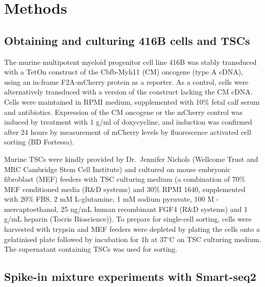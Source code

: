 \documentclass{article}
\begin{document}
\section{Methods}

\subsection{Obtaining and culturing 416B cells and TSCs}

The murine multipotent myeloid progenitor cell line 416B \cite{dexter1979isolation} was stably transduced with a TetOn construct of the Cbfb-Myh11 (CM) oncogene (type A cDNA), using an in-frame F2A-mCherry protein as a reporter. 
As a control, cells were alternatively transduced with a version of the construct lacking the CM cDNA. 
Cells were maintained in RPMI medium, supplemented with 10\% fetal calf serum and antibiotics.
Expression of the CM oncogene or the mCherry control was induced by treatment with 1 \textmu{}g/ml of doxycycline, and induction was confirmed after 24 hours by measurement of mCherry levels by fluorescence activated cell sorting (BD Fortessa).

Murine TSCs were kindly provided by Dr.\ Jennifer Nichols (Wellcome Trust and MRC Cambridge Stem Cell Institute) and cultured on mouse embryonic fibroblast (MEF) feeders with TSC culturing medium (a combination of 70\% MEF conditioned media (R\&D systems) and 30\% RPMI 1640, supplemented with 20\% FBS, 2 mM L-glutamine, 1 mM sodium pyruvate, 100 \textmu{}M \textbeta{}-mercaptoethanol, 25 ng/mL human recombinant FGF4 (R\&D systems) and 1 \textmu{}g/mL heparin (Tocris Bioscience)). 
To prepare for single-cell sorting, cells were harvested with trypsin and MEF feeders were depleted by plating the cells onto a gelatinised plate followed by incubation for 1h at 37$^{\circ}$C on TSC culturing medium. 
The supernatant containing TSCs was used for sorting.

\subsection{Spike-in mixture experiments with Smart-seq2}
\end{document}
